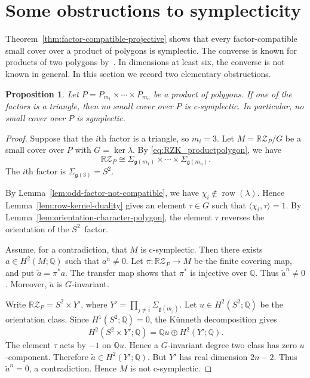 \documentclass{amsart}
\newtheorem{proposition}[theorem]{Proposition}
\numberwithin{equation}{section}
\theoremstyle{definition}
\theoremstyle{remark}
\newcommand{\Q}{\mathbb Q}
\newcommand{\RZ}{\mathbb R\mathcal Z}
\newcommand{\genus}{\mathfrak g}
\DeclareMathOperator{\row}{row}
\begin{document}
\section{Some obstructions to symplecticity}\label{sec-symplectic-obstructions}

Theorem~\ref{thm:factor-compatible-projective} shows that every factor-compatible small cover over a product of polygons is symplectic.
The converse is known for products of two polygons by~\cite{Choi2026}.
In dimensions at least six, the converse is not known in general.
In this section we record two elementary obstructions.

\begin{proposition}\label{prop:triangle-factor-not-csymp}
Let $P=P_{m_1}\times\cdots\times P_{m_n}$ be a product of polygons.
If one of the factors is a triangle, then no small cover over $P$ is c-symplectic.
In particular, no small cover over $P$ is symplectic.
\end{proposition}

\begin{proof}
Suppose that the $i$th factor is a triangle, so $m_i=3$.
Let $M = \RZ_P/G$ be a small cover over $P$ with $G=\ker \lambda$.
By \eqref{eq:RZK_productpolygon}, we have
$$
    \RZ_P \cong \Sigma_{\genus(m_1)}\times\cdots\times\Sigma_{\genus(m_n)}.
$$
The $i$th factor is $\Sigma_{\genus(3)}=S^2$.

By Lemma~\ref{lem:odd-factor-not-compatible}, we have $\chi_i\notin \row(\lambda)$.
Hence Lemma~\ref{lem:row-kernel-duality} gives an element $\tau\in G$ such that $\langle \chi_i,\tau\rangle=1$.
By Lemma~\ref{lem:orientation-character-polygon}, the element $\tau$ reverses the orientation of the $S^2$~factor.

Assume, for a contradiction, that $M$ is c-symplectic.
Then there exists $a\in H^2(M;\Q)$ such that $a^n\neq 0$.
Let $\pi\colon \RZ_P\to M$ be the finite covering map, and put $\widetilde a=\pi^\ast a$.
The transfer map shows that $\pi^\ast$ is injective over $\Q$.
Thus $\widetilde a^n\neq 0$.
Moreover, $\widetilde a$ is $G$-invariant.

Write $\RZ_P=S^2\times Y'$, where $Y'=\prod_{j\neq i}\Sigma_{\genus(m_j)}$.
Let $u\in H^2(S^2;\Q)$ be the orientation class.
Since $H^1(S^2;\Q)=0$, the K\"unneth decomposition gives
$$
    H^2(S^2\times Y';\Q) = \Q u\oplus H^2(Y';\Q).
$$
The element $\tau$ acts by $-1$ on $\Q u$.
Hence a $G$-invariant degree two class has zero $u$-component.
Therefore $\widetilde a\in H^2(Y';\Q)$.
But $Y'$ has real dimension $2n-2$.
Thus $\widetilde a^n=0$, a contradiction.
Hence $M$ is not c-symplectic.
\end{proof}
\end{document}
